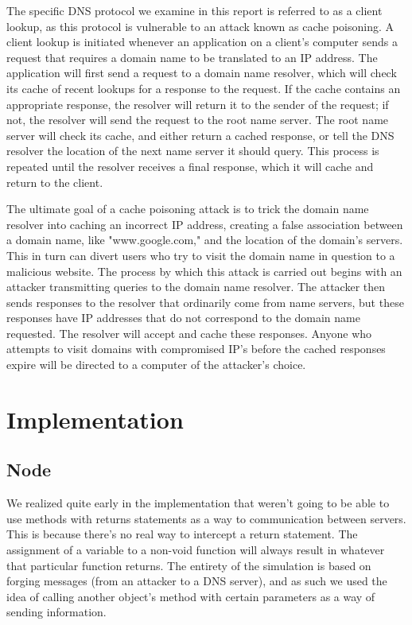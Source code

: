 \documentclass[a4paper, 12pt]{article} %
\begin{document}
The specific DNS protocol we examine in this report is referred to as a client lookup, as this protocol is vulnerable to an attack known as cache poisoning. A client lookup is initiated whenever an application on a client's computer sends a request that requires a domain name to be translated to an IP address. The application will first send a request to a domain name resolver, which will check its cache of recent lookups for a response to the request. If the cache contains an appropriate response, the resolver will return it to the sender of the request; if not, the resolver will send the request to the root name server. The root name server will check its cache, and either return a cached response, or tell the DNS resolver the location of the next name server it should query. This process is repeated until the resolver receives a final response, which it will cache and return to the client.

The ultimate goal of a cache poisoning attack is to trick the domain name resolver into caching an incorrect IP address, creating a false association between a domain name, like "www.google.com," and the location of the domain's servers. This in turn can divert users who try to visit the domain name in question to a malicious website. The process by which this attack is carried out begins with an attacker transmitting queries to the domain name resolver. The attacker then sends responses to the resolver that ordinarily come from name servers, but these responses have IP addresses that do not correspond to the domain name requested. The resolver will accept and cache these responses. Anyone who attempts to visit domains with compromised IP's before the cached responses expire will be directed to a computer of the attacker's choice. 



\section*{Implementation}

\subsection*{Node}

We realized quite early in the implementation that weren't going to be able to use methods with returns statements as a way to communication between servers. This is because there's no real way to intercept a return statement. The assignment of a variable to a non-void function will always result in whatever that particular function returns. The entirety of the simulation is based on forging messages (from an attacker to a DNS server), and as such we used the idea of calling another object's method with certain parameters as a way of sending information. 
\end{document}

